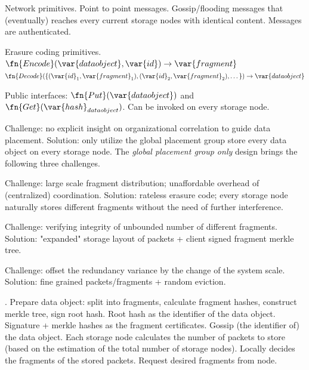 
\iffalse


\begin{outline}
Network primitives.
Point to point messages.
Gossip/flooding messages that (eventually) reaches every current storage nodes with identical content.
Messages are authenticated.

Erasure coding primitives.
$\fn{Encode}(\var{data object}, \var{id}) \rightarrow \var{fragment}$
$\fn{Decode}(\{(\var{id}_1, \var{fragment}_1), (\var{id}_2, \var{fragment}_2), \dots\}) \rightarrow \var{data object}$

Public interfaces: $\fn{Put}(\var{data object})$ and $\fn{Get}(\var{hash}_{data object})$.
Can be invoked on every storage node.

Challenge: no explicit insight on organizational correlation to guide data placement.
Solution: only utilize the global placement group \ie store every data object on every storage node.
The \emph{global placement group only} design brings the following three challenges.

Challenge: large scale fragment distribution; unaffordable overhead of (centralized) coordination.
Solution: rateless erasure code; every storage node naturally stores different fragments without the need of further interference.

Challenge: verifying integrity of unbounded number of different fragments.
Solution: "expanded" storage layout of packets + client signed fragment merkle tree.

Challenge: offset the redundancy variance by the change of the system scale.
Solution: fine grained packets/fragments + random eviction.

.
Prepare data object: split into fragments, calculate fragment hashes, construct merkle tree, sign root hash.
Root hash as the identifier of the data object.
Signature + merkle hashes as the fragment certificates.
Gossip (the identifier of) the data object.
Each storage node calculates the number of packets to store (based on the estimation of the total number of storage nodes).
Locally decides the fragments of the stored packets.
Request desired fragments from  node.


\end{outline}
